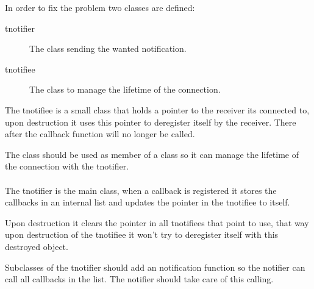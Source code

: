 In order to fix the problem two classes are defined:

\begin{description}
\item[tnotifier] The class sending the wanted notification.
\item[tnotifiee] The class to manage the lifetime of the connection.
\end{description}

The tnotifiee is a small class that holds a pointer to the receiver its
connected to, upon destruction it uses this pointer to deregister itself by the
receiver. There after the callback function will no longer be called.

The class should be used as member of a class so it can manage the lifetime of
the connection with the tnotifier.

\paragraph{}

The tnotifier is the main class, when a callback is registered it stores the
callbacks in an internal list and updates the pointer in the tnotifiee to
itself.

Upon destruction it clears the pointer in all tnotifiees that point to use, that
way upon destruction of the tnotifiee it won't try to deregister itself with
this destroyed object.

Subclasses of the tnotifier should add an notification function so the notifier
can call all callbacks in the list. The notifier should take care of this
calling.


